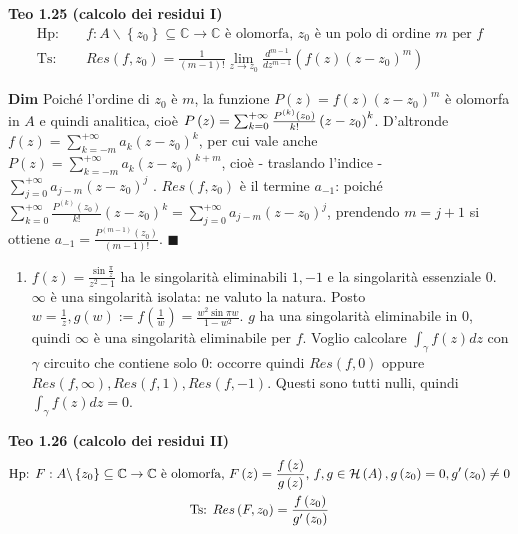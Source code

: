 \documentclass{article}
\begin{document}
\textbf{Teo 1.25 (calcolo dei residui I)} 
\begin{eqnarray*}
\text{Hp}\text{: } &&f:A\backslash \left\{ z_{0}\right\} \subseteq 
\mathbb{C}
\rightarrow 
\mathbb{C}
\text{ \`{e} olomorfa, }z_{0}\text{ \`{e} un polo di ordine }m\text{ per }f
\\
\text{Ts}\text{: } &&Res\left( f,z_{0}\right) =\frac{1}{\left( m-1\right) !}%
\lim_{z\rightarrow z_{0}}\frac{d^{m-1}}{dz^{m-1}}\left( f\left( z\right)
\left( z-z_{0}\right) ^{m}\right)
\end{eqnarray*}

\textbf{Dim} Poich\'{e} l'ordine di $z_{0}$ \`{e} $m$, la funzione $P\left(
z\right) =f\left( z\right) \left( z-z_{0}\right) ^{m}$ \`{e} olomorfa in $A$
e quindi analitica, cio\`{e} $P\left( z\right) =\sum_{k=0}^{+\infty }\frac{%
P^{\left( k\right) }\left( z_{0}\right) }{k!}\left( z-z_{0}\right) ^{k}$.
D'altronde $f\left( z\right) =\sum_{k=-m}^{+\infty }a_{k}\left(
z-z_{0}\right) ^{k}$, per cui vale anche $P\left( z\right)
=\sum_{k=-m}^{+\infty }a_{k}\left( z-z_{0}\right) ^{k+m}$, cio\`{e} -
traslando l'indice - $\sum_{j=0}^{+\infty }a_{j-m}\left( z-z_{0}\right) ^{j}$%
. $Res\left( f,z_{0}\right) $ \`{e} il termine $a_{-1}$: poich\'{e} $%
\sum_{k=0}^{+\infty }\frac{P^{\left( k\right) }\left( z_{0}\right) }{k!}%
\left( z-z_{0}\right) ^{k}=\sum_{j=0}^{+\infty }a_{j-m}\left( z-z_{0}\right)
^{j}$, prendendo $m=j+1$ si ottiene $a_{-1}=\frac{P^{\left( m-1\right)
}\left( z_{0}\right) }{\left( m-1\right) !}$. $\blacksquare $

\begin{enumerate}
\item $f\left( z\right) =\frac{\sin \frac{\pi }{z}}{z^{2}-1}$ ha le
singolarit\`{a} eliminabili $1,-1$ e la singolarit\`{a} essenziale $0$. $%
\infty $ \`{e} una singolarit\`{a} isolata: ne valuto la natura. Posto $w=%
\frac{1}{z},g\left( w\right) :=f\left( \frac{1}{w}\right) =\frac{w^{2}\sin
\pi w}{1-w^{2}}$. $g$ ha una singolarit\`{a} eliminabile in $0$, quindi $%
\infty $ \`{e} una singolarit\`{a} eliminabile per $f$. Voglio calcolare $%
\int_{\gamma }f\left( z\right) dz$ con $\gamma $ circuito che contiene solo $%
0$: occorre quindi $Res\left( f,0\right) $ oppure $Res\left( f,\infty
\right) ,Res\left( f,1\right) ,Res\left( f,-1\right) $. Questi sono tutti
nulli, quindi $\int_{\gamma }f\left( z\right) dz=0$.
\end{enumerate}

\textbf{Teo 1.26 (calcolo dei residui II)} 
\begin{gather*}
\text{Hp}\text{: }F:A\backslash \left\{ z_{0}\right\} \subseteq 
\mathbb{C}
\rightarrow 
\mathbb{C}
\text{ \`{e} olomorfa, }F\left( z\right) =\frac{f\left( z\right) }{g\left(
z\right) }\text{, }f,g\in \mathcal{H}\left( A\right) ,g\left( z_{0}\right)
=0,g^{\prime }\left( z_{0}\right) \neq 0 \\
\text{Ts}\text{: }Res\left( F,z_{0}\right) =\frac{f\left( z_{0}\right) }{%
g^{\prime }\left( z_{0}\right) }
\end{gather*}
\end{document}
